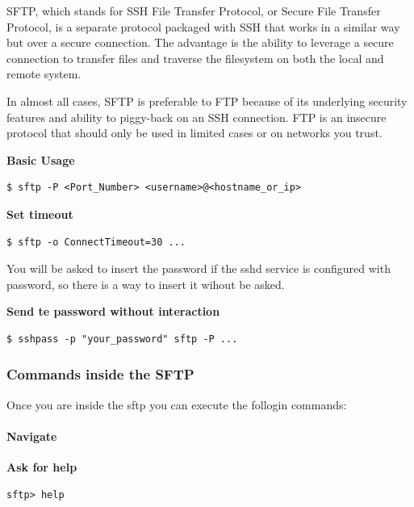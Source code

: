 \documentclass{article}
\newenvironment{codetemplate}[1][]{%
  \mybasecolorbox[#1]
  \itshape
}{%
  \endmybasecolorbox
}
\begin{document}
SFTP, which stands for SSH File Transfer Protocol, or Secure File Transfer
Protocol, is a separate protocol packaged with SSH that works in a similar way
but over a secure connection. The advantage is the ability to leverage a secure
connection to transfer files and traverse the filesystem on both the local and
remote system.

In almost all cases, SFTP is preferable to FTP because of its underlying security
features and ability to piggy-back on an SSH connection. FTP is an insecure
protocol that should only be used in limited cases or on networks you trust.

\textbf{Basic Usage}
\begin{codetemplate}{}
\begin{verbatim}
$ sftp -P <Port_Number> <username>@<hostname_or_ip>
\end{verbatim}
\end{codetemplate}

\textbf{Set timeout}
\begin{codetemplate}{}
\begin{verbatim}
$ sftp -o ConnectTimeout=30 ...
\end{verbatim}
\end{codetemplate}

You will be asked to insert the password if the sshd service is configured with password, so there is a way to insert it wihout be asked.

\textbf{Send te password without interaction}
\begin{codetemplate}{}
\begin{verbatim}
$ sshpass -p "your_password" sftp -P ...
\end{verbatim}
\end{codetemplate}

\subsubsection{Commands inside the SFTP}

Once you are inside the sftp you can execute the follogin commands:

\paragraph{Navigate}

\textbf{Ask for help}
\begin{codetemplate}{}
\begin{verbatim}
sftp> help
\end{verbatim}
\end{codetemplate}
\end{document}
